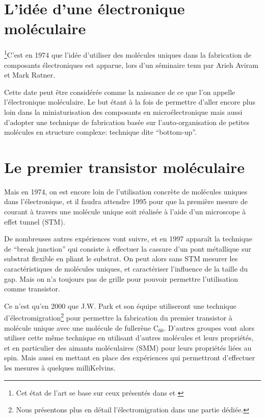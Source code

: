 \section{L'idée d'une électronique moléculaire}
\footnote{Cet état de l'art se base sur ceux présentés dans \cite{SpinMolecDynamique} et \cite{}}C'est en 1974 que l'idée d'utiliser des molécules uniques dans la fabrication de composants électroniques est apparue, lors d'un séminaire tenu par Arieh Aviram et Mark Ratner.

Cette date peut être considérée comme la naissance de ce que l'on appelle l'électronique moléculaire.
Le but étant à la fois de permettre d'aller encore plus loin dans la miniaturisation des composants en microélectronique mais aussi d'adopter une technique de fabrication basée sur l'auto-organisation de petites molécules en structure complexe: technique dite “bottom-up”.
\section{Le premier transistor moléculaire}
Mais en 1974, on est encore loin de l'utilisation concrète de molécules uniques dans l'électronique, et il faudra attendre 1995 pour que la première mesure de courant à travers une molécule unique soit réalisée à l'aide d'un microscope à effet tunnel (STM).

De nombreuses autres expériences vont suivre, et en 1997 apparaît la technique de “break junction” qui consiste à effectuer la cassure d'un pont métallique sur substrat flexible en pliant le substrat. On peut alors sans STM mesurer les caractéristiques de molécules uniques, et caractériser l'influence de la taille du gap. Mais on n'a toujours pas de grille pour pouvoir permettre l'utilisation comme transistor.

Ce n'est qu'en 2000 que J.W. Park et son équipe utiliseront une technique d'électromigration\footnote{Nous présentons plus en détail l'électromigration dans une partie dédiée.} pour permettre la fabrication du premier transistor à molécule unique avec une molécule de fullerène C$_{60}$. D'autres groupes vont alors utiliser cette même technique en utilisant d'autres molécules et leurs propriétés, et en particulier des aimants moléculaires (SMM) pour leurs propriétés liées au spin. Mais aussi en mettant en place des expériences qui permettront d'effectuer les mesures à quelques milliKelvins.

